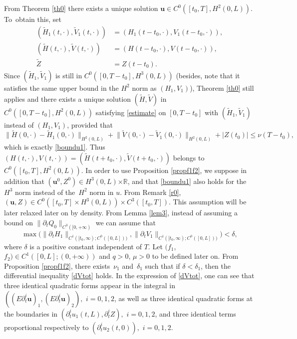 From Theorem \ref{th0} there exists a unique solution $\boldsymbol{u}\in C^{0}([{t_{0}},T],H^{2}(0,L))$.
To~obtain this, set
\begin{align*}
(\widetilde{H}_{1}(t,\cdot), \widetilde{V}_{1}(t,\cdot)) &= (H_{1}(t-t_{0},\cdot), V_{1}(t-t_{0},\cdot)), \\
(\widetilde{H}(t,\cdot), \widetilde{V}(t,\cdot)) &= (H(t-t_{0},\cdot), V(t-t_{0},\cdot)),\\
\widetilde{Z} &= Z(t-t_{0}). 
\end{align*}
Since $(\widetilde{H}_{1}, \widetilde{V}_{1})$ is still in $C^{0}([0,T-t_{0}], H^{3}(0,L))$ (besides, note that it satisfies the same upper bound in the $H^{2}$ norm as $(H_{1}, V_{1})$), Theorem \ref{th0} still applies and there exists a unique solution $(\widetilde{H},\widetilde{V})$ in $C^{0}([0,T-t_{0}],H^{2}(0,L))$ satisfying \eqref{estimate} on $[0,T-t_{0}]$ with $(\widetilde{H}_{1}, \widetilde{V}_{1})$ instead of $(H_{1}, V_{1})$, provided that
\begin{equation*}
\lVert \widetilde{H}(0,\cdot)-\widetilde{H}_{1}(0,\cdot)\rVert_{H^{2}(0,L)}+\lVert \widetilde{V}(0,\cdot)-\widetilde{V}_{1}(0,\cdot)\rVert_{H^{2}(0,L)}+|Z(t_{0})|\leq \nu(T-t_{0}),
\end{equation*}
which is exactly \eqref{boundu1}. Thus $(H(t,\cdot), V(t,\cdot)) = (\widetilde{H}(t+t_{0},\cdot), \widetilde{V}(t+t_{0},\cdot))$ belongs to $C^{0}([t_{0},T],H^{2}(0,L))$.
In order to use Proposition \ref{propf1f2}, we suppose in addition that $(\boldsymbol{u}^{0},Z^{0})\in H^{3}(0,L){\times\mathbb{R}}$, and that \eqref{boundu1} also holds for the $H^{3}$ norm instead of the~$H^{2}$ norm in $u$. From Remark \ref{r0},
$(\boldsymbol{u},Z)\!\in\! C^{0}([{t_{0}},T]\times H^{3}(0,L))\times C^{3}([{t_{0}},T])$. This assumption will be later relaxed later on by density. From Lemma \ref{lem3}, instead of assuming a bound on $\|\partial_{t} Q_{0}\|_{C^{3}([0,+\infty)}$ we can assume that
\begin{equation}
\max\bigl(\lVert\partial_{t}H_{1}\rVert_{C^{1}([t_{0},\infty);{C^{0}([0,L])})},\lVert\partial_{t}V_{1}\rVert_{C^{1}([t_{0},\infty);{C^{0}([0,L])})}\bigr)<\delta,
\label{boundHV}
\end{equation}
where $\delta$ is a positive constant {independent of $T$}. Let $(f_{1}$, $f_{2})\in C^{1}([0,L];(0,+\infty))$ and $q>0$, $\mu>0$ to be defined later on. From Proposition \ref{propf1f2}, there exists~$\nu_{1}$ and~$\delta_{1}$ such that if $\delta<\delta_{1}$, then the differential inequality \eqref{dVtot} holds.
In the expression of \eqref{dVtot}, one can see that three identical quadratic forms appear in the integral in $((E\partial_{t}^{i}\boldsymbol{u})_{1},(E\partial_{t}^{i}\boldsymbol{u})_{2}),$ $i=0,1,2$, as well as three identical quadratic forms at the boundaries in $(\partial_{t}^{i}u_{1}(t,L),\partial_{t}^{i}Z),$ $i=0,1,2$, and three identical terms proportional respec\-tively to $(\partial_{t}^{i}u_{2}(t,0)),$ $i=0,1,2$.
